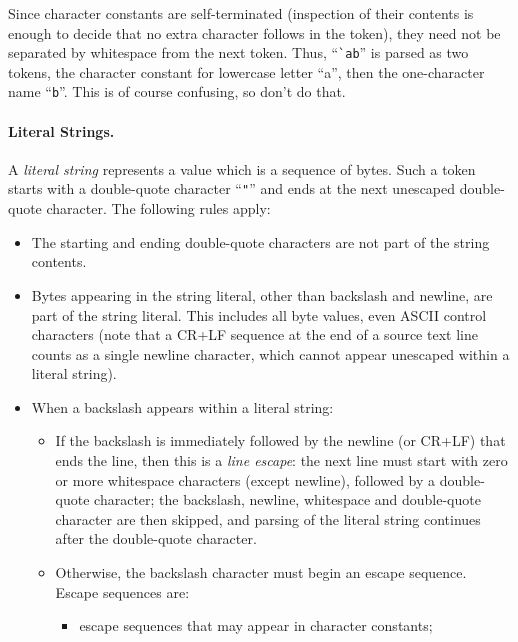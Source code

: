 Since character constants are self-terminated (inspection of their
contents is enough to decide that no extra character follows in the
token), they need not be separated by whitespace from the next token.
Thus, ``\verb|`ab|'' is parsed as two tokens, the character constant for
lowercase letter ``a'', then the one-character name ``\verb|b|''. This
is of course confusing, so don't do that.

\paragraph{Literal Strings.} A \emph{literal string} represents a value
which is a sequence of bytes. Such a token starts with a double-quote
character ``\verb|"|'' and ends at the next unescaped double-quote
character. The following rules apply:
\begin{itemize}

    \item The starting and ending double-quote characters are not part
    of the string contents.

    \item Bytes appearing in the string literal, other than backslash
    and newline, are part of the string literal. This includes all byte
    values, even ASCII control characters (note that a CR+LF sequence at
    the end of a source text line counts as a single newline character,
    which cannot appear unescaped within a literal string).

    \item When a backslash appears within a literal string:
    \begin{itemize}

        \item If the backslash is immediately followed by the newline
        (or CR+LF) that ends the line, then this is a \emph{line
        escape}: the next line must start with zero or more whitespace
        characters (except newline), followed by a double-quote
        character; the backslash, newline, whitespace and double-quote
        character are then skipped, and parsing of the literal string
        continues after the double-quote character.

        \item Otherwise, the backslash character must begin an escape
        sequence. Escape sequences are:
        \begin{itemize}

            \item escape sequences that may appear in character constants;


\end{itemize}
\end{itemize}
\end{itemize}
